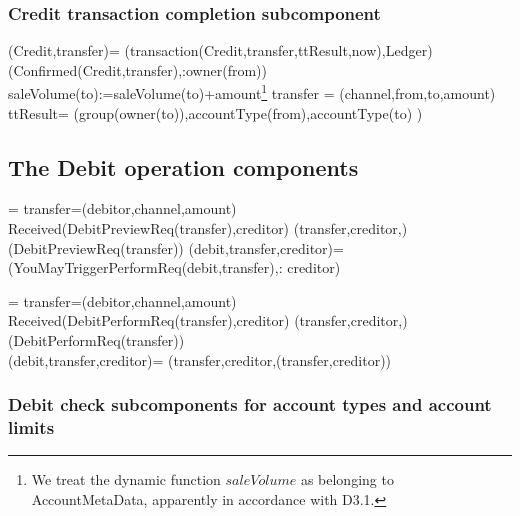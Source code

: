  \subsubsection{Credit transaction completion subcomponent}
 \begin{asm}
 (Credit,transfer)=\+   
 (transaction(Credit,transfer,ttResult,now),Ledger)\\
 (Confirmed(Credit,transfer),\TO :owner(from))\\
 saleVolume(to):=saleVolume(to)+amount\footnote{We treat the dynamic function $saleVolume$ as belonging to AccountMetaData, apparently in accordance with D3.1.} \-
 \WHERE \+
 transfer = (channel,from,to,amount)\\
 ttResult= (group(owner(to)),accountType(from),accountType(to) )
 \end{asm}
 
 \subsection{The Debit operation components}
 

\begin{asm}
  =\+
\LET  transfer=(debitor,channel,amount)\+
  \IF Received(DebitPreviewReq(transfer),\FROM creditor) \THEN \+   
    (transfer,creditor,)\\
    (DebitPreviewReq(transfer)) \-
  \WHERE \+
     (debit,transfer,creditor)=\+
        (YouMayTriggerPerformReq(debit,transfer),\TO : creditor)
\end{asm}
 

 
 \begin{asm}
  =\+
 \LET  transfer=(debitor,channel,amount)\+
    \IF Received(DebitPerformReq(transfer),\FROM creditor) \THEN \+  
       (transfer,creditor,)\\
       (DebitPerformReq(transfer))\-
    \WHERE \\
 (debit,transfer,creditor)=\+
 (transfer,creditor,(transfer,creditor))
 \end{asm}
 
 \subsubsection{Debit check subcomponents for account types and account limits}
 
